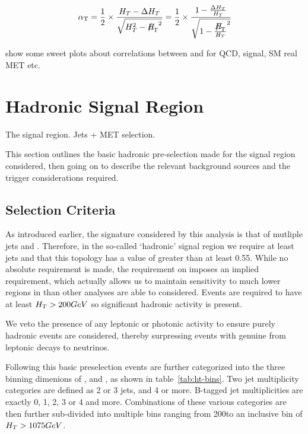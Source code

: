 \begin{equation}
\alphat = \frac{1}{2} \times \frac{\HT-\deltaHT}{\sqrt{\HT^2 - \mht^2}} = 
\frac{1}{2} \times \frac{1-\frac{\deltaHT}{\HT}}{\sqrt{1 - \frac{\mht}{\HT}^2}}
\label{eq:alphat_njet}
\end{equation}

show some sweet plots about correlations between \mht and \deltaHT for QCD, 
signal, SM real MET etc.


\section{Hadronic Signal Region}
\label{sec:selection_hadronic}
The signal region. Jets + MET selection.

This section outlines the basic hadronic pre-selection made for the signal 
region considered, then going on to describe the relevant background sources and
the trigger considerations required.

\subsection{Selection Criteria}
\label{sec:selec_crit}
As introduced earlier, the signature considered by this analysis is that of 
mutliple jets and \met. Therefore, in the so-called `hadronic' signal region we 
require at least jets and that this topology has a value of \alphat greater than
at least 0.55. While no absolute \met requirement is made, the requirement on 
\alphat imposes an implied requirement, which actually allows us to maintain 
sensitivity to much lower regions in \met than other analyses are able to 
considered. Events are required to have at least $H_T > 200 GeV$ so significant
hadronic activity is present.

We veto the presence of any leptonic or 
photonic activity to ensure purely hadronic events are considered, thereby 
surpressing events with genuine \met from leptonic decays to neutrinos.

Following this basic preselection events are further categorized into the three 
binning dimenions of \HT, \nb and \nj, as shown in table~\ref{tab:ht-bins}. Two 
jet multiplicity categories are defined as 2 or 3 jets, and 4 or more. B-tagged 
jet multiplicities are exactly 0, 1, 2, 3 or 4 and more. Combinations of these 
various categories are then further sub-divided into multiple \HT bins ranging 
from 200\gev to an inclusive bin of $H_T>1075GeV$.

